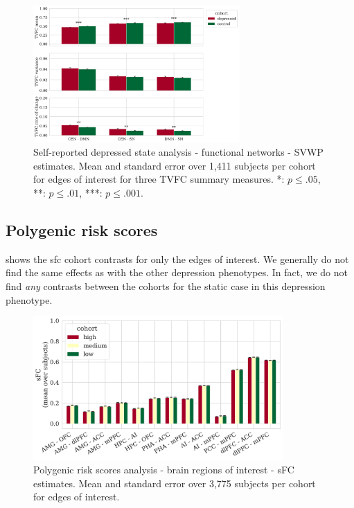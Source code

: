 \begin{figure}[h]
  \centering
  \includegraphics[width=0.7\textwidth]{fig/ukbiobank/TVFC_predictions_summaries/self_reported_depression_state/cohort_comparison/FN/correlation_all_TVFC_summary_measures_SVWP_joint_edges_of_interest}
  \caption{
    Self-reported depressed state analysis - functional networks - SVWP estimates.
    Mean and standard error over 1,411 subjects per cohort for edges of interest for three TVFC summary measures.
    *: $p \leq .05$, **: $p \leq .01$, ***: $p \leq .001$.
  }\label{fig:ukb-results-srds-fn-cohort-comparison-edges-of-interest-wp}
\end{figure}


\clearpage
\subsection{Polygenic risk scores}

 shows the \gls{sfc} cohort contrasts for only the edges of interest.
We generally do not find the same effects as with the other depression phenotypes.
In fact, we do not find \emph{any} contrasts between the cohorts for the static case in this depression phenotype.


\begin{figure}[h]
  \centering
  \includegraphics[width=0.85\textwidth]{fig/ukbiobank/TVFC_predictions_summaries/pgs/cohort_comparison/ROI/correlation_TVFC_mean_sFC_edges_of_interest}
  \caption{
    Polygenic risk scores analysis - brain regions of interest - sFC estimates.
    Mean and standard error over 3,775 subjects per cohort for edges of interest.
  }\label{fig:ukb-results-pgs-roi-cohort-comparison-edges-of-interest-sfc}
\end{figure}


